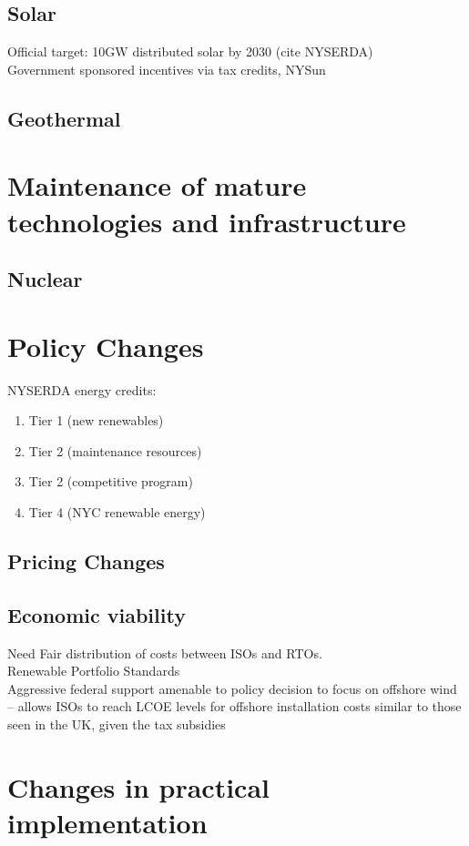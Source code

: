 \documentclass[plain]{article}
\newcommand{\1}{\mathbbm{1}}
\begin{document}
\subsection{Solar}
Official target: 10GW distributed solar by 2030 (cite NYSERDA)\\
Government sponsored incentives via tax credits, NYSun

\subsection{Geothermal}
\section{Maintenance of mature technologies and infrastructure}
\subsection{Nuclear}



\section{Policy Changes}
NYSERDA energy credits:
	\begin{enumerate}
		\item Tier 1 (new renewables)
		\item Tier 2 (maintenance resources)
		\item Tier 2 (competitive program)
		\item Tier 4 (NYC renewable energy)
	\end{enumerate}
\subsection{Pricing Changes}
\subsection{Economic viability}
Need Fair distribution of costs between ISOs and RTOs. \cite{mitchell_review_2022}\\
Renewable Portfolio Standards\\
Aggressive federal support amenable to policy decision to focus on offshore wind -- allows ISOs to reach LCOE  levels for offshore installation costs similar to those seen in the UK, given the tax subsidies \cite{mitchell_review_2022}\\

\section{Changes in practical implementation}
\end{document}
